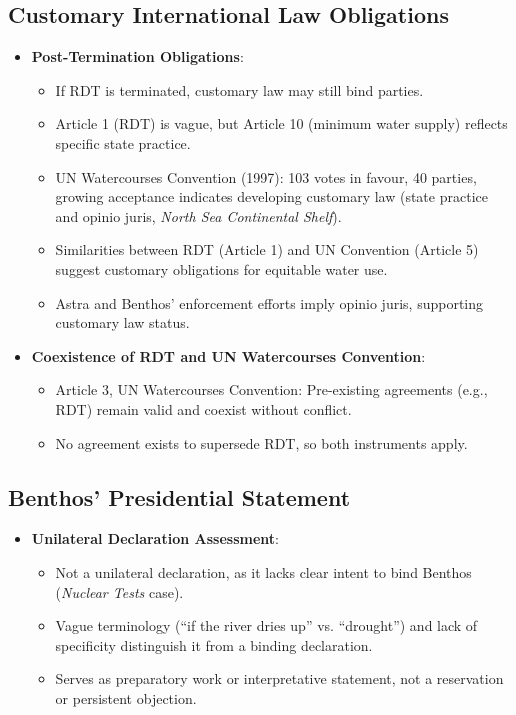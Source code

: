 \subsection{Customary International Law Obligations}
\begin{itemize}
    \item \textbf{Post-Termination Obligations}:
    \begin{itemize}
        \item If RDT is terminated, customary law may still bind parties.
        \item Article 1 (RDT) is vague, but Article 10 (minimum water supply) reflects specific state practice.
        \item UN Watercourses Convention (1997): 103 votes in favour, 40 parties, growing acceptance indicates developing customary law (state practice and opinio juris, \textit{North Sea Continental Shelf}).
        \item Similarities between RDT (Article 1) and UN Convention (Article 5) suggest customary obligations for equitable water use.
        \item Astra and Benthos’ enforcement efforts imply opinio juris, supporting customary law status.
    \end{itemize}
    \item \textbf{Coexistence of RDT and UN Watercourses Convention}:
    \begin{itemize}
        \item Article 3, UN Watercourses Convention: Pre-existing agreements (e.g., RDT) remain valid and coexist without conflict.
        \item No agreement exists to supersede RDT, so both instruments apply.
    \end{itemize}
\end{itemize}

\subsection{Benthos’ Presidential Statement}
\begin{itemize}
    \item \textbf{Unilateral Declaration Assessment}:
    \begin{itemize}
        \item Not a unilateral declaration, as it lacks clear intent to bind Benthos (\textit{Nuclear Tests} case).
        \item Vague terminology (“if the river dries up” vs. “drought”) and lack of specificity distinguish it from a binding declaration.
        \item Serves as preparatory work or interpretative statement, not a reservation or persistent objection.
    \end{itemize}
\end{itemize}

